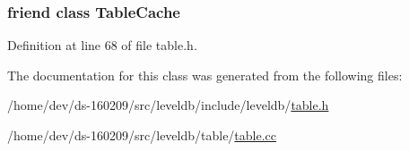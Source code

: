 \subsubsection[{Table\+Cache}]{\setlength{\rightskip}{0pt plus 5cm}friend class {\bf Table\+Cache}\hspace{0.3cm}{\ttfamily [friend]}}\label{classleveldb_1_1_table_ae1e5f7bae4682672cfcc68d0add43199}


Definition at line 68 of file table.\+h.



The documentation for this class was generated from the following files\+:\begin{DoxyCompactItemize}
\item 
/home/dev/ds-\/160209/src/leveldb/include/leveldb/\hyperlink{table_8h}{table.\+h}\item 
/home/dev/ds-\/160209/src/leveldb/table/\hyperlink{table_8cc}{table.\+cc}\end{DoxyCompactItemize}
